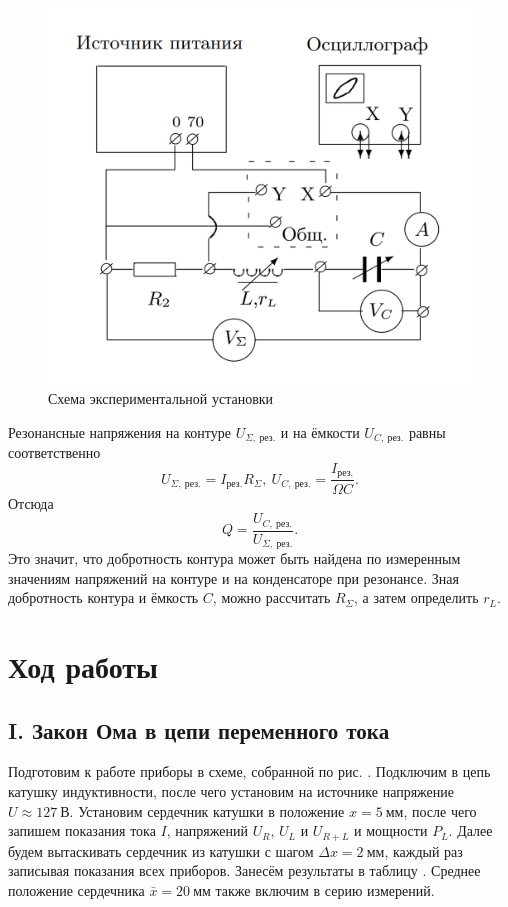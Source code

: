 \documentclass[a4paper,10pt]{article}
\begin{document}
\begin{figure}[h]
	\centering
	\includegraphics[scale=0.35]{Device_2}
	\caption{Схема экспериментальной установки} \label{Device_2}
\end{figure}

Резонансные напряжения на контуре $U_{\Sigma,\ \text{рез.}}$ и на ёмкости $U_{C,\ \text{рез.}}$ равны соответственно\[U_{\Sigma,\ \text{рез.}}=I_{\text{рез.}}R_{\Sigma},\ U_{C,\ \text{рез.}}=\frac{I_{\text{рез.}}}{\Omega C}.\]Отсюда\[Q=\frac{U_{C,\ \text{рез.}}}{U_{\Sigma,\ \text{рез.}}}.\]Это значит, что добротность контура может быть найдена по измеренным значениям напряжений на контуре и на конденсаторе при резонансе. Зная добротность контура и ёмкость $C$, можно рассчитать $R_{\Sigma}$, а затем определить $r_L$.

\section*{Ход работы}

\subsection*{I. Закон Ома в цепи переменного тока}

Подготовим к работе приборы в схеме, собранной по рис. . Подключим в цепь катушку индуктивности, после чего установим на источнике напряжение $U\approx127~\text{В}$. Установим сердечник катушки в положение $x=5~\text{мм}$, после чего запишем показания тока $I$, напряжений $U_R$, $U_L$ и $U_{R+L}$ и мощности $P_L$. Далее будем вытаскивать сердечник из катушки с шагом $\Delta x = 2~\text{мм}$, каждый раз записывая показания всех приборов. Занесём результаты в таблицу . Среднее положение сердечника $\bar{x}=20~\text{мм}$ также включим в серию измерений.
\end{document}
